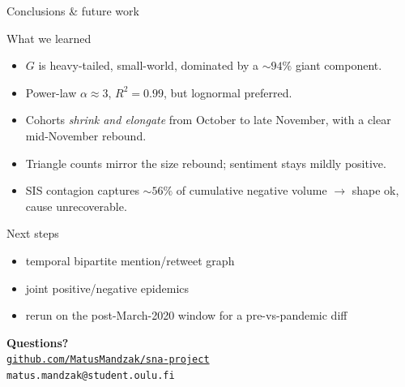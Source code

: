 \documentclass[aspectratio=169,10pt]{beamer}
\begin{document}
\begin{frame}{Conclusions \& future work}
  \begin{block}{What we learned}
    \begin{itemize}\itemsep2pt
      \item \(G\) is heavy-tailed, small-world, dominated by a
            \(\sim\!94\%\) giant component.
      \item Power-law \(\alpha\!\approx\!3\), \(R^{2}\!=\!0.99\),
            \alert{but} lognormal preferred.
      \item Cohorts \emph{shrink and elongate} from October to
            late November, with a clear mid-November
            rebound.
      \item Triangle counts mirror the size rebound; sentiment
            stays mildly positive.
      \item SIS contagion captures \(\sim\!56\%\) of cumulative
            negative volume \(\rightarrow\) shape ok, cause
            unrecoverable.
    \end{itemize}
  \end{block}
  \begin{block}{Next steps}
    \begin{itemize}\itemsep2pt
      \item temporal bipartite mention/retweet graph
      \item joint positive/negative epidemics
      \item rerun on the post-March-2020 window for a
            pre-vs-pandemic diff
    \end{itemize}
  \end{block}
\end{frame}

\begin{frame}[c]
  \begin{center}
    {\Huge \color{accent}\textbf{Questions?}}\\[14pt]
    \href{https://github.com/MatusMandzak/sna-project}%
      {\texttt{github.com/MatusMandzak/sna-project}}\\[6pt]
    \footnotesize \texttt{matus.mandzak@student.oulu.fi}
  \end{center}
\end{frame}
\end{document}

